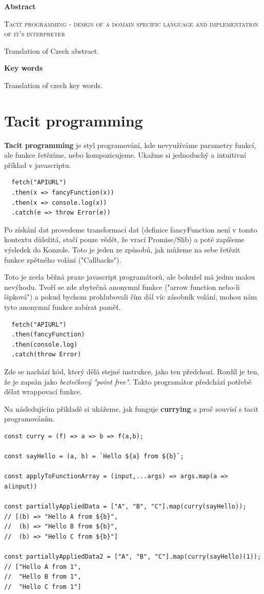 \documentclass[male,czech]{kithesis}
\newcommand{\TITULen}{Tacit programming - design of a domain specific language and implementation of it's interpreter} %
\begin{document}
\textbf{\textsf{Abstract}}

\textsc{\TITULen}

Translation of Czech abstract.

\textbf{\textsf{Key words}}

Translation of czech key words.

\tableofcontents



\chapter{Tacit programming}

\textbf{Tacit programming} je styl programování, kde nevyužíváme parametry funkcí, 
ale funkce řetězíme, nebo kompozicujeme. Ukažme si jednoduchý a intuitivní příklad v javascriptu.

\begin{verbatim}
  fetch("APIURL")
  .then(x => fancyFunction(x))
  .then(x => console.log(x))
  .catch(e => throw Error(e))
\end{verbatim}

Po získání dat provedeme transformaci dat (definice fancyFunction není v tomto kontextu důležitá, stačí pouze vědět, že vrací Promise/Slib) a poté zapíšeme výsledek do Konzole. 
Toto je jeden ze způsobů, jak můžeme na sebe řetězit funkce zpětného volání ("Callbacks").

Toto je zcela běžná praxe javascript programátorů, ale bohužel má jednu malou nevýhodu.
Tvoří se zde zbytečná anonymní funkce ("arrow function nebo-li šipková") a pokud bychom prohlubovali čím dál víc 
zásobník volání, mohou nám tyto anonymní funkce zabírat paměť. 

\begin{verbatim}
  fetch("APIURL")
  .then(fancyFunction)
  .then(console.log)
  .catch(throw Error)
\end{verbatim}

Zde se nachází kód, který dělá stejné instrukce, jako ten předchozí. Rozdíl je ten, že je zapsán jako \textit{beztečkový "point free"}.
Takto programátor předchází potřebě dělat wrappovací funkce.

Na následujícím přikladě si ukážeme, jak funguje \textbf{currying} a proč souvisí s tacit programováním.

\begin{verbatim}
const curry = (f) => a => b => f(a,b);

const sayHello = (a, b) = `Hello ${a} from ${b}`;

const applyToFunctionArray = (input,...args) => args.map(a => a(input))

const partiallyAppliedData = ["A", "B", "C"].map(curry(sayHello)); 
// [(b) => "Hello A from ${b}", 
//  (b) => "Hello B from ${b}", 
//  (b) => "Hello C from ${b}"]

const partiallyAppliedData2 = ["A", "B", "C"].map(curry(sayHello)(1)); 
// ["Hello A from 1", 
//  "Hello B from 1", 
//  "Hello C from 1"]
\end{verbatim}
\end{document}
